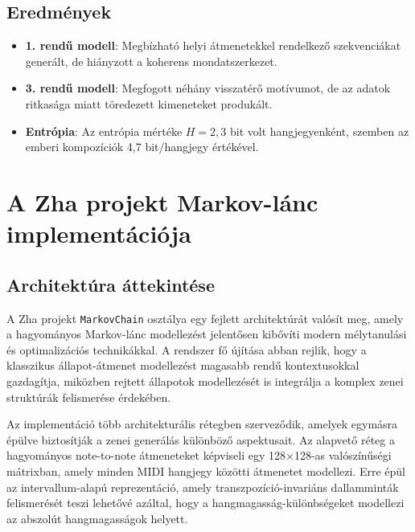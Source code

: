 \subsection{Eredmények}

\begin{itemize}
    \item \textbf{1. rendű modell}: Megbízható helyi átmenetekkel rendelkező szekvenciákat generált, de hiányzott a koherens mondatszerkezet.
    \item \textbf{3. rendű modell}: Megfogott néhány visszatérő motívumot, de az adatok ritkasága miatt töredezett kimeneteket produkált.
    \item \textbf{Entrópia}: Az entrópia mértéke \( H = 2,3 \) bit volt hangjegyenként, szemben az emberi kompozíciók 4,7 bit/hangjegy értékével.
\end{itemize}


\section{A Zha projekt Markov-lánc implementációja}

\subsection{Architektúra áttekintése}

A Zha projekt \texttt{MarkovChain} osztálya egy fejlett architektúrát valósít meg, amely a hagyományos Markov-lánc modellezést jelentősen kibővíti modern mélytanulási és optimalizációs technikákkal. A rendszer fő újítása abban rejlik, hogy a klasszikus állapot-átmenet modellezést magasabb rendű kontextusokkal gazdagítja, miközben rejtett állapotok modellezését is integrálja a komplex zenei struktúrák felismerése érdekében.

Az implementáció több architekturális rétegben szerveződik, amelyek egymásra épülve biztosítják a zenei generálás különböző aspektusait. Az alapvető réteg a hagyományos note-to-note átmeneteket képviseli egy 128×128-as valószínűségi mátrixban, amely minden MIDI hangjegy közötti átmenetet modellezi. Erre épül az intervallum-alapú reprezentáció, amely transzpozíció-invariáns dallamminták felismerését teszi lehetővé azáltal, hogy a hangmagasság-különbségeket modellezi az abszolút hangmagasságok helyett.


